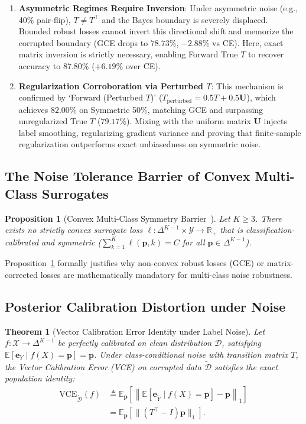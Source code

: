 \documentclass[journal]{IEEEtran}
\newtheorem{theorem}{Theorem}
\newtheorem{proposition}{Proposition}
\theoremstyle{definition}
\begin{document}
\begin{enumerate}
    \item \textbf{Asymmetric Regimes Require Inversion}: Under asymmetric noise (e.g., 40\% pair-flip), $T \ne T^\top$ and the Bayes boundary is severely displaced. Bounded robust losses cannot invert this directional shift and memorize the corrupted boundary (GCE drops to $78.73\%$, $-2.88\%$ vs CE). Here, exact matrix inversion is strictly necessary, enabling Forward True $T$ to recover accuracy to $87.80\%$ ($+6.19\%$ over CE).
    \item \textbf{Regularization Corroboration via Perturbed $T$}: This mechanism is confirmed by `Forward (Perturbed $T$)' ($T_{\text{perturbed}} = 0.5 T + 0.5 \mathbf{U}$), which achieves $82.00\%$ on Symmetric 50\%, matching GCE and surpassing unregularized True $T$ ($79.17\%$). Mixing with the uniform matrix $\mathbf{U}$ injects label smoothing, regularizing gradient variance and proving that finite-sample regularization outperforms exact unbiasedness on symmetric noise.
\end{enumerate}

\subsection{The Noise Tolerance Barrier of Convex Multi-Class Surrogates}
\begin{proposition}[Convex Multi-Class Symmetry Barrier~\cite{charoenphakdee2019symmetric}]
\label{prop:convex_barrier}
Let $K \ge 3$. There exists no strictly convex surrogate loss $\ell: \Delta^{K-1} \times \mathcal{Y} \to \mathbb{R}_+$ that is classification-calibrated and symmetric ($\sum_{k=1}^K \ell(\mathbf{p}, k) = C$ for all $\mathbf{p} \in \Delta^{K-1}$).
\end{proposition}
Proposition~\ref{prop:convex_barrier} formally justifies why non-convex robust losses (GCE) or matrix-corrected losses are mathematically mandatory for multi-class noise robustness.

\subsection{Posterior Calibration Distortion under Noise}
\begin{theorem}[Vector Calibration Error Identity under Label Noise]
\label{thm:vce}
Let $f: \mathcal{X} \to \Delta^{K-1}$ be perfectly calibrated on clean distribution $\mathcal{D}$, satisfying $\mathbb{E}[\mathbf{e}_Y \mid f(X) = \mathbf{p}] = \mathbf{p}$. Under class-conditional noise with transition matrix $T$, the Vector Calibration Error (VCE) on corrupted data $\tilde{\mathcal{D}}$ satisfies the exact population identity:
\begin{align}
\text{VCE}_{\tilde{\mathcal{D}}}(f) &\triangleq \mathbb{E}_{\mathbf{p}} \left[ \left\| \mathbb{E}[\mathbf{e}_{\tilde{Y}} \mid f(X) = \mathbf{p}] - \mathbf{p} \right\|_1 \right] \nonumber \\
&= \mathbb{E}_{\mathbf{p}} \left[ \| (T^\top - I) \mathbf{p} \|_1 \right].
\end{align}
\end{theorem}
\end{document}
